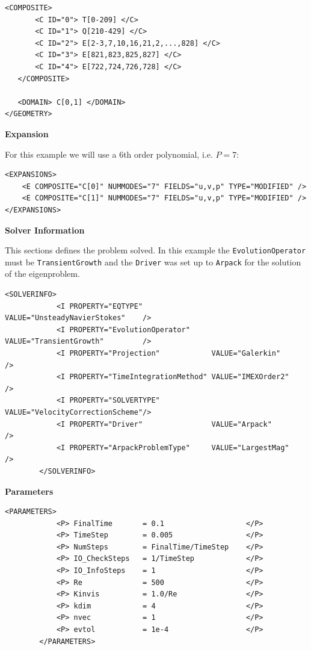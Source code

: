       \begin{lstlisting}[style=XMLStyle]
<COMPOSITE>
       <C ID="0"> T[0-209] </C>
       <C ID="1"> Q[210-429] </C>
       <C ID="2"> E[2-3,7,10,16,21,2,...,828] </C>
       <C ID="3"> E[821,823,825,827] </C>
       <C ID="4"> E[722,724,726,728] </C>
   </COMPOSITE>
   
   <DOMAIN> C[0,1] </DOMAIN>
</GEOMETRY>
        \end{lstlisting}

\textbf{Expansion}

For this example we will use a 6th order polynomial, i.e. $P=7$:

      \begin{lstlisting}[style=XMLStyle]
<EXPANSIONS>
    <E COMPOSITE="C[0]" NUMMODES="7" FIELDS="u,v,p" TYPE="MODIFIED" />
    <E COMPOSITE="C[1]" NUMMODES="7" FIELDS="u,v,p" TYPE="MODIFIED" />
</EXPANSIONS> 
        \end{lstlisting}

\textbf{Solver Information}

This sections defines the problem solved. In this example the \texttt{EvolutionOperator} must be \texttt{TransientGrowth} and the \texttt{Driver} was set up to \texttt{Arpack} for the solution of the eigenproblem. 

      \begin{lstlisting}[style=XMLStyle]
 <SOLVERINFO>
            <I PROPERTY="EQTYPE"                VALUE="UnsteadyNavierStokes"    />
            <I PROPERTY="EvolutionOperator"     VALUE="TransientGrowth"         />
            <I PROPERTY="Projection"            VALUE="Galerkin"                />
            <I PROPERTY="TimeIntegrationMethod" VALUE="IMEXOrder2"              />
            <I PROPERTY="SOLVERTYPE"            VALUE="VelocityCorrectionScheme"/>
            <I PROPERTY="Driver"                VALUE="Arpack"                  />
            <I PROPERTY="ArpackProblemType"     VALUE="LargestMag"              />
        </SOLVERINFO>
                \end{lstlisting}


\textbf{Parameters}

      \begin{lstlisting}[style=XMLStyle]
<PARAMETERS>
            <P> FinalTime       = 0.1                   </P>
            <P> TimeStep        = 0.005                 </P>
            <P> NumSteps        = FinalTime/TimeStep    </P>
            <P> IO_CheckSteps   = 1/TimeStep            </P>
            <P> IO_InfoSteps    = 1                     </P>
            <P> Re              = 500                   </P>
            <P> Kinvis          = 1.0/Re                </P>
            <P> kdim            = 4                     </P>
            <P> nvec            = 1                     </P>
            <P> evtol           = 1e-4                  </P>
        </PARAMETERS>
                        \end{lstlisting}
                        
